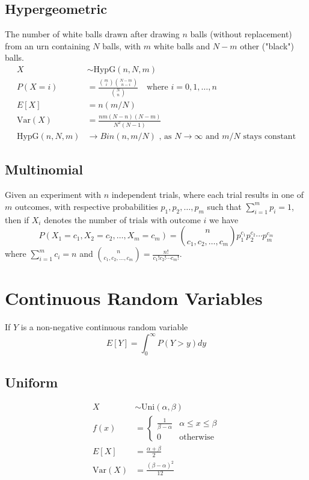 \documentclass[12pt]{article}
\newcommand{\Sp}{\text{ }}
\newcommand{\Var}{\text{Var}}
\newcommand{\HypG}{\text{HypG}}
\newcommand{\Where}{\Sp\text{ where }}
\begin{document}
\subsection{Hypergeometric}
The number of white balls drawn after drawing $n$ balls (without replacement) from an urn containing $N$ balls, with $m$ white balls and $N-m$ other ("black") balls.
\begin{align*}
    X& \sim \HypG(n,N,m) \\
    P(X = i)& = \frac{\binom{m}{i} \binom{N-m}{n-i}}{\binom{N}{n}} \Where i = 0, 1, \ldots, n \\
        E[X]& = n(m/N) \\
     \Var(X)& = \frac{nm(N-n)(N-m)}{N^2(N-1)} \\
\HypG(n,N,m)& \rightarrow Bin(n, m/N) \text{ , as } N \rightarrow \infty \text{ and } m/N \text{ stays constant}
\end{align*}

\subsection{Multinomial}
Given an experiment with $n$ independent trials, where each trial results in one of $m$ outcomes, with respective probabilities $p_1, p_2, \ldots, p_m$ such that $\sum_{i=1}^{m} p_i = 1$, then if $X_i$ denotes the number of trials with outcome $i$ we have
$$P(X_1 = c_1, X_2 = c_2, \ldots, X_m = c_m) = \binom{n}{c_1, c_2, \ldots, c_m} p_1^{c_1} p_2^{c_2} \cdots p_m^{c_m}$$
where $\sum_{i=1}^{m} c_i = n$ and $\binom{n}{c_1, c_2, \ldots, c_m} = \frac{n!}{c_1! c_2! \cdots c_m!}$.

\section{Continuous Random Variables}
If $Y$ is a non-negative continuous random variable
$$E[Y] = \int_{0}^{\infty} P(Y > y) dy$$
\subsection{Uniform}
\begin{align*}
    X& \sim \text{Uni}(\alpha, \beta) \\
 f(x)& = \left\{
        \begin{array}{ll}
            \frac{1}{\beta - \alpha} & \alpha \leq x \leq \beta \\
                                   0 &\text{otherwise}
        \end{array}
    \right. \\
    E[X]& = \frac{\alpha + \beta}{2} \\
 \Var(X)& = \frac{(\beta - \alpha)^2}{12}
\end{align*}
\end{document}
